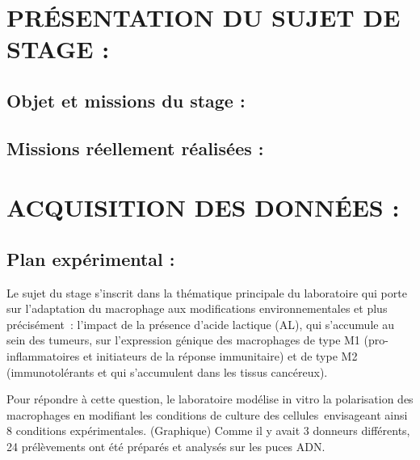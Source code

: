 \documentclass[a4paper,10pt]{article}
\begin{document}
\section{PR\'{E}SENTATION DU SUJET DE STAGE :}
\subsection{Objet et missions du stage :}
\subsection{Missions réellement réalisées :}
\section{ACQUISITION DES DONN\'{E}ES :}

\subsection{ Plan expérimental :}
Le sujet du stage s’inscrit dans la thématique principale du laboratoire qui porte sur l’adaptation du macrophage aux modifications environnementales et plus précisément : l’impact de la présence d’acide lactique (AL), qui s’accumule au sein des tumeurs, sur l’expression génique des macrophages de type M1 (pro-inflammatoires et initiateurs de la réponse immunitaire) et de type M2 (immunotolérants et qui s’accumulent dans les tissus cancéreux).

Pour répondre à cette question, le laboratoire modélise in vitro la polarisation des macrophages en modifiant les conditions de culture des cellules envisageant ainsi 8 conditions expérimentales. (Graphique) Comme il y avait 3 donneurs différents, 24 prélèvements ont été préparés et analysés sur les puces ADN.
\end{document}
